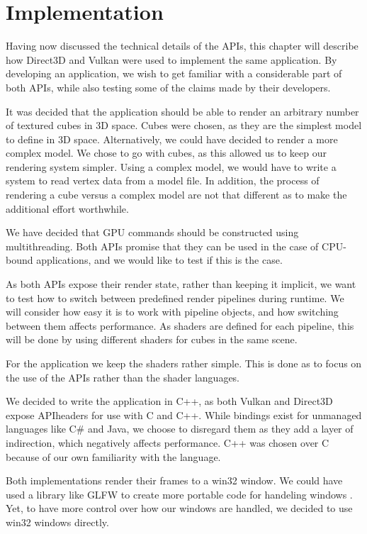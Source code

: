 \chapter{Implementation}\label{ch:implementation}
Having now discussed the technical details of the \glspl{API}, this chapter will describe how Direct3D and Vulkan were used to implement the same application. 
By developing an application, we wish to get familiar with a considerable part of both \glspl{API}, while also testing some of the claims made by their developers.


It was decided that the application should be able to render an arbitrary number of textured cubes in 3D space.
Cubes were chosen, as they are the simplest model to define in 3D space.
Alternatively, we could have decided to render a more complex model.
We chose to go with cubes, as this allowed us to keep our rendering system simpler.
Using a complex model, we would have to write a system to read vertex data from a model file.
In addition, the process of rendering a cube versus a complex model are not that different as to make the additional effort worthwhile. 


We have decided that \gls{GPU} commands should be constructed using multithreading.
Both \glspl{API} promise that they can be used in the case of \gls{CPU}-bound applications, and we would like to test if this is the case.

As both \glspl{API} expose their render state, rather than keeping it implicit, we want to test how to switch between predefined render pipelines during runtime.
We will consider how easy it is to work with pipeline objects, and how switching between them affects performance.
As shaders are defined for each pipeline, this will be done by using different shaders for cubes in the same scene.

 
For the application we keep the shaders rather simple.
This is done as to focus on the use of the \glspl{API} rather than the shader languages.


We decided to write the application in C++, as both Vulkan and Direct3D expose \gls{API}headers for use with C and C++.
While bindings exist for unmanaged languages like C\# and Java, we choose to disregard them as they add a layer of indirection, which negatively affects performance.
C++ was chosen over C because of our own familiarity with the language. 

Both implementations render their frames to a win32 window.
We could have used a library like GLFW to create more portable code for handeling windows \cite{GLFW}. 
Yet, to have more control over how our windows are handled, we decided to use win32 windows directly.  

